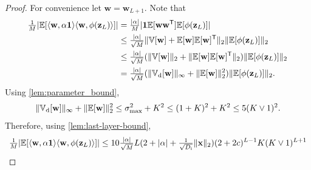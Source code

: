 \documentclass[twoside]{article}
\renewcommand{\ss}[1]{_{\text{#1}}}
\newcommand{\vw}{\mathbf{w}}
\newcommand{\vx}{\mathbf{x}}
\newcommand{\vz}{\mathbf{z}}
\newcommand{\vone}{\mathbf{1}}
\newcommand{\E}{\mathbb{E}}
\newcommand{\V}{\mathbb{V}}
\newcommand{\T}{\text{\textsf{T}}}
\renewcommand{\ss}[1]{_{\text{#1}}}        %
\DeclarePairedDelimiter\lra{\langle}{\rangle}    %
\DeclarePairedDelimiter\norm{\|}{\|}             %
\DeclarePairedDelimiter\abs{|}{|}                %
\theoremstyle{theoremstyle}
\begin{document}
\begin{proof}
    For convenience let $\vw = \vw_{L+1}$.
    Note that
    \begin{align}
        \tfrac1{M}\abs{\E[\lra{\vw, \alpha \vone} \lra{\vw, \phi(\vz_L)}]}
        &= \tfrac{\abs{\alpha}}{M} \abs{\vone \E[\vw \vw^\T] \E[\phi(\vz_L)]} \\
        &\le \tfrac{\abs{\alpha}}{\sqrt{M}}\norm{\V[\vw] + \E[\vw]\E[\vw]^\T}_2 \norm{\E[\phi(\vz_L)]}_2 \\
        &\le \tfrac{\abs{\alpha}}{\sqrt{M}}
        (
            \norm{\V[\vw]}_2 + \norm{\E[\vw]\E[\vw]^\T}_2
        )
        \norm{\E[\phi(\vz_L)]}_2 \\
        &= \tfrac{\abs{\alpha}}{\sqrt{M}}
        (
            \norm{\V\ss{d}[\vw]}_\infty + \norm{\E[\vw]}_2^2
        )
        \norm{\E[\phi(\vz_L)]}_2.
    \end{align}
    Using \cref{lem:parameter_bound}, 
    \begin{equation}
        \norm{\V\ss{d}[\vw]}_\infty + \norm{\E[\vw]}_2^2
        \le \sigma\ss{max}^2 + K^2 \le (1 + K)^2 + K^2 \le 5 (K \lor 1)^2.
    \end{equation}
    Therefore, using \cref{lem:last-layer-bound},
    \begin{equation}
        \tfrac1{M}\abs{\E[\lra{\vw, \alpha \vone} \lra{\vw, \phi(\vz_L)}]}
        \le 10 \tfrac{\abs{\alpha}}{\sqrt{M}} L(2 + \abs{\alpha} + \tfrac{1}{\sqrt{D\ss{i}}}\norm{\vx}_2)(2 + 2c)^{L - 1}K(K \lor 1)^{L + 1}
    \end{equation}

\end{proof}
\end{document}
